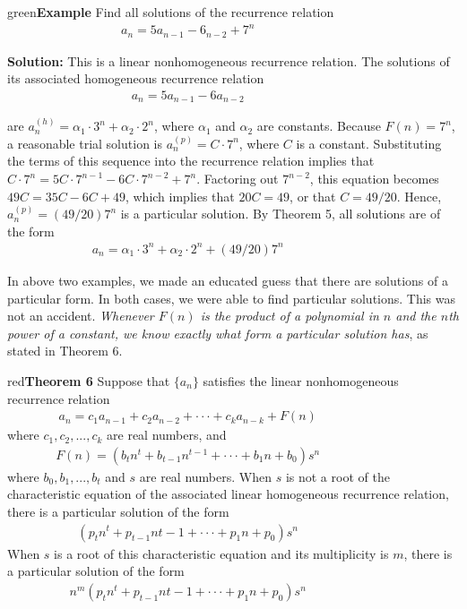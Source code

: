 \documentclass[11pt]{article}
\newenvironment{example}[1][\unskip]{\begin{mybox}{green}{\textbf{Example} {#1}}}{\end{mybox}}
\newenvironment{theorem}[1]{\begin{mybox}{red}{\textbf{Theorem #1}}}{\end{mybox}}
\begin{document}
\begin{example}
Find all solutions of the recurrence relation
\begin{align*}
    a_n = 5a_{n-1} - 6_{n-2} + 7^n & & & & & & & & &
\end{align*}

\textbf{Solution:} 
This is a linear nonhomogeneous recurrence relation. The solutions of its associated homogeneous recurrence relation
\begin{align*}
   a_n = 5a_{n-1} - 6a_{n-2} & & & & & & & & & 
\end{align*}

are $a_n^{(h)} = \alpha_1 \cdot 3^n + \alpha_2 \cdot 2^n$, where $\alpha_1$ and $\alpha_2$ are constants. Because $F(n) = 7^n$, a reasonable trial solution is $a_n^{(p)} = C \cdot 7^n$, where $C$ is a constant. Substituting the terms of this sequence into the recurrence relation implies that $C \cdot 7^n = 5C \cdot 7^{n-1} - 6C \cdot 7^{n-2} + 7^n$. Factoring out $7^{n-2}$, this equation becomes $49C = 35C - 6C + 49$, which implies that $20C = 49$, or that $C = 49/20$.
Hence, $a_n^{(p)} = (49/20)7^n$ is a particular solution. By Theorem 5, all solutions are of the form
\begin{align*}
    a_n = \alpha_1 \cdot 3^n + \alpha_2 \cdot 2^n + (49/20)7^n & & & & & & & & &
\end{align*}
\end{example}

\newpage In above two examples, we made an educated guess that there are solutions of a particular form. In both cases, we were able to find particular solutions. This was not an accident. \textit{Whenever $F(n)$ is the product of a polynomial in $n$ and the $n$th power of a constant, we know exactly what form a particular solution has}, as stated in Theorem 6.

\begin{theorem}{6}
Suppose that $\{a_n\}$ satisfies the linear nonhomogeneous recurrence relation
\begin{align*}
    a_n = c_1a_{n-1} + c_2a_{n-2} + \cdot \cdot \cdot + c_ka_{n-k} + F(n) & & & & & & & & &
\end{align*}
where $c_1, c_2, ..., c_k$ are real numbers, and 
\begin{align*}
    F(n) = (b_tn^t + b_{t-1}n^{t-1} + \cdot \cdot \cdot + b_1n + b_0)s^n & & & & & & & & &
\end{align*}
where $b_0, b_1, ..., b_t$ and $s$ are real numbers. When $s$ is not a root of the characteristic equation of the associated linear homogeneous recurrence relation, there is a particular solution of the form
\begin{align*}
    (p_tn^t + p_{t-1}n{t-1} + \cdot \cdot \cdot + p_1n + p_0)s^n & & & & & & & & &
\end{align*}
When $s$ is a root of this characteristic equation and its multiplicity is $m$, there is a particular solution of the form
\begin{align*}
    n^m(p_tn^t + p_{t-1}n{t-1} + \cdot \cdot \cdot + p_1n + p_0)s^n & & & & & & & & &
\end{align*}
\end{theorem}
\end{document}
